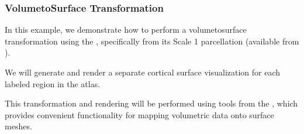 \documentclass[letterpaper,10pt,english]{jupyterBook}
\begin{document}
\subsubsection{Volume\sphinxhyphen{}to\sphinxhyphen{}Surface Transformation}
\label{\detokenize{chapters/03/03c_visualization-examples:volume-to-surface-transformation}}
\sphinxAtStartPar
In this example, we demonstrate how to perform a volume\sphinxhyphen{}to\sphinxhyphen{}surface transformation using the , specifically from its Scale 1 parcellation (available from ).

\sphinxAtStartPar
We will generate and render a separate cortical surface visualization for each labeled region in the atlas.

\sphinxAtStartPar
This transformation and rendering will be performed using tools from the , which provides convenient functionality for mapping volumetric data onto surface meshes.
\end{document}
